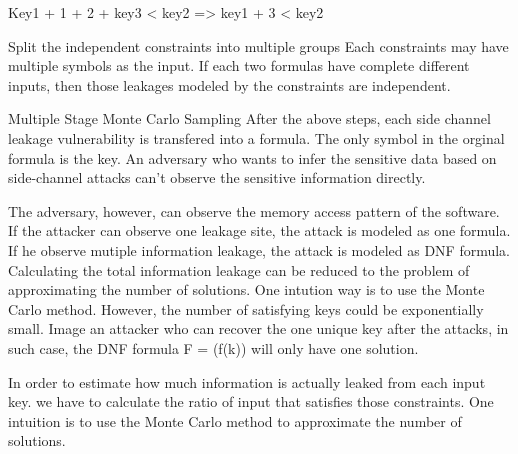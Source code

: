 Key1 + 1 + 2 + key3 < key2 => key1 + 3 < key2

Split the independent constraints into multiple groups
Each constraints may have multiple symbols as the input. If each two formulas have complete different inputs, then those leakages modeled by the constraints are independent. 

Multiple Stage Monte Carlo Sampling
After the above steps, each side channel leakage vulnerability is transfered into a formula. The only symbol in the
orginal formula is the key. An adversary who wants to infer the sensitive data based on side-channel attacks can’t observe the sensitive information directly. 

The adversary, however, can observe the memory access pattern of the software. If the attacker can observe
one leakage site, the attack is modeled as one formula. If he observe mutiple information leakage, the attack
is modeled as DNF formula. Calculating the total information leakage can be reduced to the problem of approximating
the number of solutions. One intution way is to use the Monte Carlo method. However, the number of satisfying 
keys could be exponentially small. Image an attacker who can recover the one unique key after the attacks,
in such case, the DNF formula F = (f(k)) will only have one solution.

In order to estimate how much information is actually leaked from each input key.
we have to calculate the ratio of input that satisfies those constraints. One intuition is to
use the Monte Carlo method to approximate the number of solutions. 